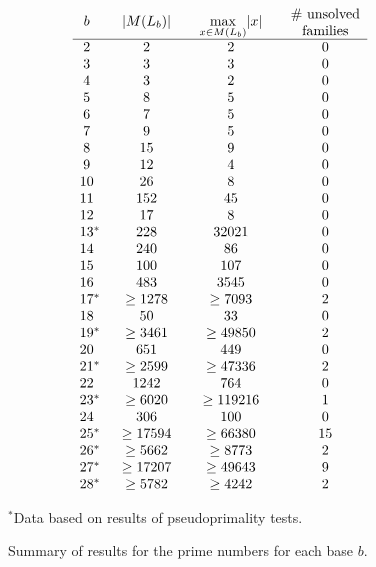 \documentclass[12pt]{article}
\theoremstyle{plain}
\theoremstyle{definition}
\theoremstyle{remark}
\newcommand{\0}{\mathtt{0}}
\newcommand{\1}{\mathtt{1}}
\newcommand{\2}{\mathtt{2}}
\newcommand{\3}{\mathtt{3}}
\newcommand{\4}{\mathtt{4}}
\newcommand{\5}{\mathtt{5}}
\newcommand{\6}{\mathtt{6}}
\newcommand{\7}{\mathtt{7}}
\newcommand{\8}{\mathtt{8}}
\newcommand{\9}{\mathtt{9}}
\begin{document}
\begin{figure}\[\begin{array}{c@{\qquad}c@{\qquad}c@{\qquad}c}
b & \lvert M(L_b)\rvert & \max\limits_{x\in M(L_b)}\lvert x\rvert & \parbox{5em}{\centering\# unsolved\\families} \\ \hline
2 & 2 & 2 & 0 \\ 
3 & 3 & 3 & 0 \\ 
4 & 3 & 2 & 0 \\ 
5 & 8 & 5 & 0 \\ 
6 & 7 & 5 & 0 \\ 
7 & 9 & 5 & 0 \\ 
8 & 15 & 9 & 0 \\ 
9 & 12 & 4 & 0 \\ 
10 & 26 & 8 & 0 \\ 
11 & 152 & 45 & 0 \\ 
12 & 17 & 8 & 0 \\ 
13\mathrlap{^*} & 228 & 32021 & 0 \\ 
14 & 240 & 86 & 0 \\ 
15 & 100 & 107 & 0 \\ 
16 & 483 & 3545 & 0 \\ 
17\mathrlap{^*} & \geq1278 & \geq7093 & 2 \\ 
18 & 50 & 33 & 0 \\ 
19\mathrlap{^*} & \geq3461 & \geq49850 & 2 \\ 
20 & 651 & 449 & 0 \\ 
21\mathrlap{^*} & \geq2599 & \geq47336 & 2 \\ 
22 & 1242 & 764 & 0 \\ 
23\mathrlap{^*} & \geq6020 & \geq119216 & 1 \\ 
24 & 306 & 100 & 0 \\ 
25\mathrlap{^*} & \geq17594 & \geq66380 & 15 \\ 
26\mathrlap{^*} & \geq5662 & \geq8773 & 2 \\ 
27\mathrlap{^*} & \geq17207 & \geq49643 & 9 \\ 
28\mathrlap{^*} & \geq5782 & \geq4242 & 2 
\end{array}\]
\begin{center}$^*$Data based on results of pseudoprimality tests.\end{center}
\caption{Summary of results for the prime numbers for each base $b$.}
\label{resultsfig}
\end{figure}
\end{document}
